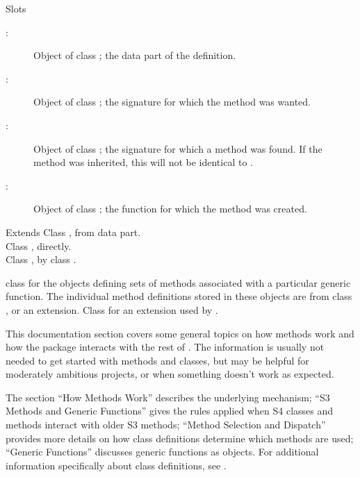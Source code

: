 \begin{Section}{Slots}
\begin{description}

\item[:] Object of class ; the data
part of the definition. 
\item[:] Object of class ; the
signature for which the method was wanted. 
\item[:] Object of class ; the
signature for which a method was found.  If the method was
inherited, this will not be identical to . 
\item[:] Object of class ; the function
for which the method was created. 

\end{description}

\end{Section}
%
\begin{Section}{Extends}
Class , from data part.\\{}
Class , directly.\\{}
Class , by class .
\end{Section}
%
\begin{SeeAlso}\relax
class  for the objects
defining sets of methods associated with a particular generic
function.  The individual method definitions stored in these objects
are from class , or an extension.
Class  for an extension used by
.
\end{SeeAlso}
%
\begin{Description}\relax
This documentation section covers some general topics on how methods
work and how the  package interacts with the rest of \R{}.  The
information is usually not needed to get started with methods and
classes, but may be helpful for moderately ambitious projects, or when
something doesn't work as expected.

The section ``How Methods Work'' describes the underlying
mechanism; ``S3 Methods and Generic Functions'' gives the rules applied when S4
classes and methods interact with older S3 methods; ``Method Selection and Dispatch'' provides more
details on how class definitions determine which methods are used;
``Generic Functions'' discusses generic functions as objects.
For additional information specifically about class definitions, see .
\end{Description}

